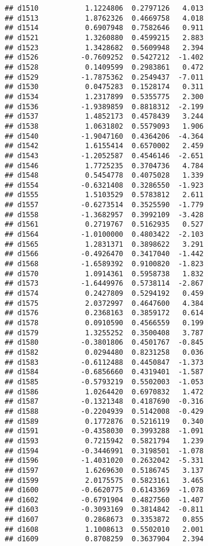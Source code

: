 \documentclass[
]{article}
\begin{document}
\begin{verbatim}
## d1510           1.1224806  0.2797126   4.013
## d1513           1.8762326  0.4669758   4.018
## d1514           0.6907948  0.7582646   0.911
## d1521           1.3260880  0.4599215   2.883
## d1523           1.3428682  0.5609948   2.394
## d1526          -0.7609252  0.5427212  -1.402
## d1528           0.1409599  0.2983861   0.472
## d1529          -1.7875362  0.2549437  -7.011
## d1530           0.0475283  0.1528174   0.311
## d1534           1.2317899  0.5355775   2.300
## d1536          -1.9389859  0.8818312  -2.199
## d1537           1.4852173  0.4578439   3.244
## d1538           1.0631802  0.5579093   1.906
## d1540          -1.9047160  0.4364206  -4.364
## d1542           1.6155414  0.6570002   2.459
## d1543          -1.2052587  0.4546146  -2.651
## d1546           1.7725235  0.3704736   4.784
## d1548           0.5454778  0.4075028   1.339
## d1554          -0.6321408  0.3286550  -1.923
## d1555           1.5103529  0.5783812   2.611
## d1557          -0.6273514  0.3525590  -1.779
## d1558          -1.3682957  0.3992109  -3.428
## d1561           0.2719767  0.5162935   0.527
## d1564          -1.0100000  0.4803422  -2.103
## d1565           1.2831371  0.3898622   3.291
## d1566          -0.4926470  0.3417040  -1.442
## d1568          -1.6589392  0.9100820  -1.823
## d1570           1.0914361  0.5958738   1.832
## d1573          -1.6449976  0.5738114  -2.867
## d1574           0.2427809  0.5294192   0.459
## d1575           2.0372997  0.4647600   4.384
## d1576           0.2368163  0.3859172   0.614
## d1578           0.0910590  0.4566559   0.199
## d1579           1.3255252  0.3500408   3.787
## d1580          -0.3801806  0.4501767  -0.845
## d1582           0.0294480  0.8231258   0.036
## d1583          -0.6112488  0.4450847  -1.373
## d1584          -0.6856660  0.4319401  -1.587
## d1585          -0.5793219  0.5502003  -1.053
## d1586           1.0264420  0.6970832   1.472
## d1587          -0.1321348  0.4187690  -0.316
## d1588          -0.2204939  0.5142008  -0.429
## d1589           0.1772876  0.5216119   0.340
## d1591          -0.4358030  0.3993288  -1.091
## d1593           0.7215942  0.5821794   1.239
## d1594          -0.3446991  0.3198501  -1.078
## d1596          -1.4031020  0.2632042  -5.331
## d1597           1.6269630  0.5186745   3.137
## d1599           2.0175575  0.5823161   3.465
## d1600          -0.6620775  0.6143369  -1.078
## d1602          -0.6791904  0.4827560  -1.407
## d1603          -0.3093169  0.3814842  -0.811
## d1607           0.2868673  0.3353872   0.855
## d1608           1.1008613  0.5502010   2.001
## d1609           0.8708259  0.3637904   2.394

\end{verbatim}
\end{document}
